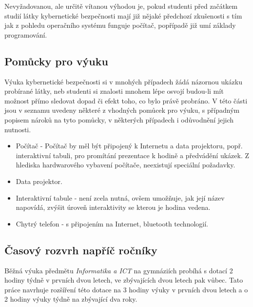 \documentclass[a4paper, 12pt]{article}
\begin{document}
Nevyžadovanou, ale určitě vítanou výhodou je, pokud studenti před začátkem studií látky kybernetické bezpečnosti mají již nějaké předchozí zkušenosti s tím jak z pohledu operačního systému funguje počítač, popřípadě již umí základy programování.

\subsection{Pomůcky pro výuku}
Výuka kybernetické bezpečnosti si v mnohých případech žádá názornou ukázku probírané látky, neb studenti si znalosti mnohem lépe osvojí budou-li mít možnost přímo sledovat dopad či efekt toho, co bylo právě probráno. V této části jsou v seznamu uvedeny některé z vhodných pomůcek pro výuku, s případným popisem nároků na tyto pomůcky, v některých případech i odůvodnění jejich nutnosti.

\begin{itemize}
    \setlength{\itemsep}{-3pt}
    \item Počítač - Počítač by měl být připojený k Internetu a data projektoru, popř. interaktivní tabuli, pro promítání prezentace k hodině a předvádění ukázek. Z hlediska hardwarového vybavení počítače, neexistují speciální požadavky.
    \item Data projektor.
    \item Interaktivní tabule - není zcela nutná, ovšem umožňuje, jak její název napovídá, zvýšit úroveň interaktivity se kterou je hodina vedena.
    \item Chytrý telefon - s připojením na Internet, bluetooth technologií.
\end{itemize}

\subsection{Časový rozvrh napříč ročníky}
Běžná výuka předmětu \textit{Informatika a ICT} na gymnáziích probíhá s dotací 2 hodiny týdně v prvních dvou letech, ve zbývajících dvou letech pak vůbec. Tato práce navrhuje rozšíření této dotace na 3 hodiny výuky v prvních dvou letech a o 2 hodiny výuky týdně na zbývající dva roky.
\end{document}
